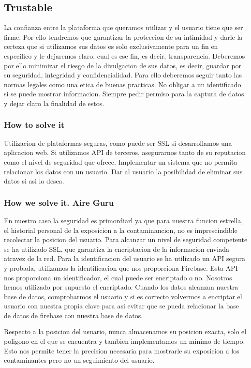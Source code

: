 \subsection{Trustable}
La confianza entre la plataforma que queramos utilizar y el usuario tiene que ser firme.
Por ello tendremos que garantizar la proteccion de su intimidad y darle la certeza que si 
utilizamos sus datos es solo exclusivamente para un fin en especifico y le dejaremos claro,
cual es ese fin, es decir, transparencia. 
Deberemos por ello minimizar el riesgo de la divulgacion de sus datos, es decir, guardar
por su seguridad, integridad y confidencialidad. 
Para ello deberemos seguir tanto las normas legales como una etica de buenas practicas.
No obligar a un identificado si se puede mostrar informacion.
Siempre pedir permiso para la captura de datos y dejar claro la finalidad de estos.


\subsubsection{How to solve it} 
Utilizacion de plataformas seguras, como puede ser SSL si desarrollamos una aplicacion web.
Si utilizamos API de terceros, asegurarnos tanto de su reputacion como el nivel de seguridad que ofrece.
Implementar un sistema que no permita relacionar los datos con un usuario.
Dar al usuario la posibilidad de eliminar sus datos si asi lo desea.


\subsubsection{How we solve it. Aire Guru} 
En nuestro caso la seguridad es primordiarl ya que para nuestra funcion estrella, el historial personal
de la exposicion a la contaminancion, no es imprescindible recolectar la posicion del usuario.
Para alcanzar un nivel de seguridad competente se ha utilizado SSL, que garantiza la encriptacion de 
la informacion enviada atravez de la red.
Para la identificacion del usuario se ha utilizado un API segura y probada, utilizamos la identificacion
que nos proporciona Firebase. Esta API nos proporciona un identificador, el cual puede ser encriptado o no.
Nosotros hemos utilizado por supuesto el encriptado. Cuando los datos alcanzan nuestra base de datos, 
comprobarmos el usuario y si es correcto volvermos a encriptar el usuario con nuestra propia clave para
asi evitar que se pueda relacionar la base de datos de firebase con nuestra base de datos.

Respecto a la posicion del usuario, nunca almacenamos su posicion exacta, solo el poligono en el que se encuentra
y tambien implementamos un minimo de tiempo. Esto nos permite tener la precision necesaria para mostrarle su 
exposicion a los contaminantes pero no un seguimiento del usuario.

